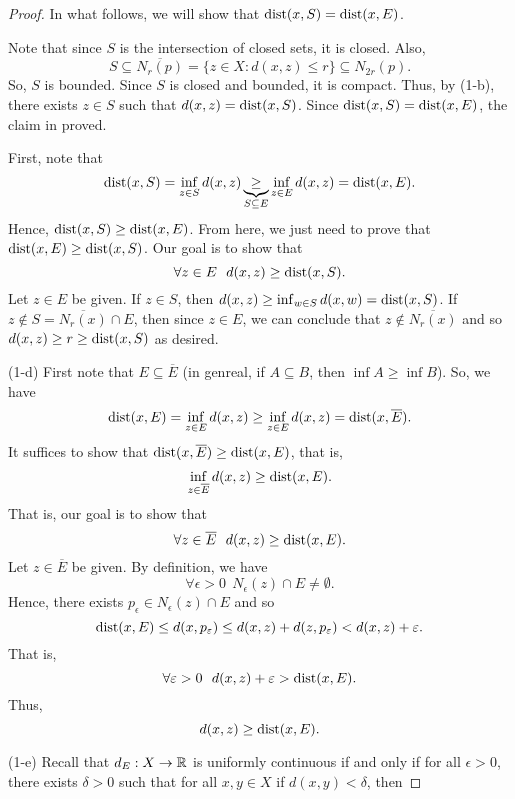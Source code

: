 \documentclass[a4paper]{article}
\begin{document}
\begin{proof}
    In what follows, we will show that \( \operatorname{dist}(x,S) = \operatorname{dist}(x,E) \).
    \begin{remark}
        Note that since \( S  \) is the intersection of closed sets, it is closed. Also, 
        \[  S \subseteq  \overline{{N}_{r}(p)} = \{ z \in X : d(x,z) \leq r  \}  \subseteq  {N}_{2r}(p). \]
        So, \( S  \) is bounded. Since \( S  \) is closed and bounded, it is compact. Thus, by (1-b), there exists \( z \in S  \) such that \( d(x,z) = \operatorname{dist}(x,S) \). Since \( \operatorname{dist}(x,S) = \operatorname{dist}(x,E)  \), the claim in proved.  
    \end{remark}
    First, note that 
    \[  \operatorname{dist}(x,S) = \inf_{z \in S } d(x,z) \underbrace{\geq}_{S \subseteq E} \inf_{z \in E } d(x,z) = \operatorname{dist}(x,E).  \]
    Hence, \( \operatorname{dist}(x,S) \geq \operatorname{dist}(x,E) \). From here, we just need to prove that \( \operatorname{dist}(x,E) \geq \operatorname{dist}(x,S)  \). Our goal is to show that 
    \[  \forall z \in E \ \ d(x,z) \geq \operatorname{dist}(x,S). \]
    Let \( z \in E \) be given. If \( z \in S  \), then \( d(x,z) \geq \inf_{w \in S} d(x,w) = \operatorname{dist}(x,S) \). If \( z \notin S = \overline{{N}_{r}(x)} \cap E  \), then since \( z \in E  \), we can conclude that \( z \notin \overline{{N}_{r}(x)} \) and so \( d(x,z) \geq r \geq \operatorname{dist}(x,S) \) as desired.
        \item[(1-d)] First note that \( E \subseteq  \overline{E} \) (in genreal, if \( A \subseteq  B  \), then \( \inf A \geq \inf B  \)). So, we have 
            \[  \operatorname{dist}(x,E) = \inf_{z \in E } d(x,z) \geq \inf_{z \in E } d(x,z) = \operatorname{dist}(x,\overline{E}). \]
            It suffices to show that \( \operatorname{dist}(x,\overline{E}) \geq \operatorname{dist}(x,E)  \), that is,
            \[  \inf_{z \in \overline{E}} d(x,z) \geq \operatorname{dist}(x,E). \]
            That is, our goal is to show that 
            \[  \forall z \in \overline{E} \ \ d(x,z) \geq \dist(x,E). \]
            Let \( z \in \overline{E}  \) be given. By definition, we have 
            \[  \forall \epsilon > 0 \ \ {N}_{\epsilon}(z) \cap E \neq \emptyset.  \]
            Hence, there exists \( {p}_{\epsilon} \in {N}_{\epsilon}(z) \cap E  \) and so 
            \[  \operatorname{dist}(x,E) \leq d(x, {p}_{\varepsilon}) \leq d(x,z) + d(z,{p}_{\varepsilon}) < d(x,z) + \varepsilon. \]
            That is, 
            \[  \forall \varepsilon  > 0 \ \ d(x,z) + \varepsilon > \operatorname{dist}(x,E). \]
            Thus, 
            \[  d(x,z) \geq \operatorname{dist}(x,E). \]
        \item[(1-e)] Recall that \( {d}_{E} : X \to \mathbb{R}  \) is uniformly continuous if and only if for all \( \epsilon > 0  \), there exists \( \delta > 0  \) such that for all \( x ,y \in X  \) if \( d(x,y) < \delta \), then

\end{proof}
\end{document}
